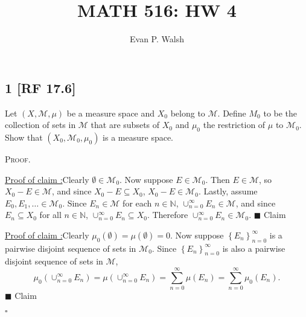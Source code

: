 \documentclass[12pt]{article}
\title{MATH 516: HW 4}
\author{Evan P. Walsh}
\newcounter{ProofCounter}
\newcounter{ClaimCounter}[ProofCounter]
\newenvironment{Proof}{\stepcounter{ProofCounter}\textsc{Proof.}}{\hfill$\square$}
\newenvironment{claim}[1]{\vspace{1mm}\stepcounter{ClaimCounter}\par\noindent\underline{\bf Claim \theClaimCounter:}\space#1}{}
\newenvironment{claimproof}[1]{\par\noindent\underline{Proof of claim \theClaimCounter:}\space#1}{\hfill $\blacksquare$ Claim \theClaimCounter}
\begin{document}
\maketitle

\subsection*{1 [RF 17.6]}
\begin{tcolorbox}
Let $(X, \mathcal{M}, \mu)$ be a measure space and $X_{0}$ belong to $\mathcal{M}$. Define $M_{0}$ to be the collection of sets in $\mathcal{M}$ that
are subsets of $X_{0}$ and $\mu_{0}$ the restriction of $\mu$ to $\mathcal{M}_{0}$. Show that $(X_{0}, \mathcal{M}_{0}, \mu_{0})$ is a measure space.
\end{tcolorbox}
\begin{Proof}

\begin{claimproof}
Clearly $\emptyset \in \mathcal{M}_{0}$. Now suppose $E \in \mathcal{M}_{0}$. Then $E \in \mathcal{M}$, so $X_{0} - E \in \mathcal{M}$, and since
$X_{0} - E \subseteq X_{0}$, $X_{0} - E \in \mathcal{M}_{0}$. Lastly, assume $E_{0}, E_{1}, \hdots \in \mathcal{M}_{0}$. Since $E_{n} \in \mathcal{M}$
for each $n \in \mathbb{N}$, $\cup_{n=0}^{\infty}E_{n} \in \mathcal{M}$, and since $E_{n} \subseteq X_{0}$ for all $n \in \mathbb{N}$,
$\cup_{n=0}^{\infty}E_{n}\subseteq X_{0}$. Therefore $\cup_{n=0}^{\infty}E_{n} \in \mathcal{M}_{0}$.
\end{claimproof}

\begin{claimproof}
Clearly $\mu_{0}(\emptyset) = \mu(\emptyset) = 0$. Now suppose $\left\{ E_{n} \right\}_{n=0}^{\infty}$ is a pairwise disjoint sequence of sets in
$\mathcal{M}_{0}$. Since $\left\{ E_{n} \right\}_{n=0}^{\infty}$ is also a pairwise disjoint sequence of sets in $\mathcal{M}$,
\[ \mu_{0}\left( \cup_{n=0}^{\infty}E_{n} \right) = \mu\left( \cup_{n=0}^{\infty}E_{n} \right) = \sum_{n=0}^{\infty}\mu(E_{n}) =
\sum_{n=0}^{\infty}\mu_{0}(E_{n}). \]
\end{claimproof}

\end{Proof}

\newpage
\end{document}
